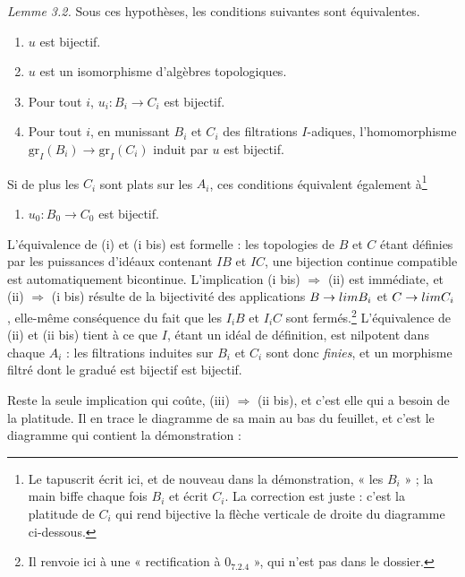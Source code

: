 \documentclass[11pt,a4paper]{article}
\begin{document}
\emph{Lemme 3.2.} Sous ces hypothèses, les conditions suivantes sont
équivalentes.

\begin{enumerate}
  \item[(i)] $u$ est bijectif.
  \item[(i bis)] $u$ est un isomorphisme d'algèbres topologiques.
  \item[(ii)] Pour tout $i$, $u_i : B_i \to C_i$ est bijectif.
  \item[(ii bis)] Pour tout $i$, en munissant $B_i$ et $C_i$ des filtrations
  $I$-adiques, l'homomorphisme $\mathrm{gr}_I(B_i) \to \mathrm{gr}_I(C_i)$
  induit par $u$ est bijectif.
\end{enumerate}

Si de plus les $C_i$ sont plats sur les $A_i$, ces conditions équivalent
également à\footnote{Le tapuscrit écrit ici, et de nouveau dans la
démonstration, « les $B_i$ » ; la main biffe chaque fois $B_i$ et écrit $C_i$.
La correction est juste : c'est la platitude de $C_i$ qui rend bijective la
flèche verticale de droite du diagramme ci-dessous.}

\begin{enumerate}
  \item[(iii)] $u_0 : B_0 \to C_0$ est bijectif.
\end{enumerate}

L'équivalence de (i) et (i bis) est formelle : les topologies de $B$ et $C$
étant définies par les puissances d'idéaux contenant $IB$ et $IC$, une
bijection continue compatible est automatiquement bicontinue. L'implication
(i bis) $\Rightarrow$ (ii) est immédiate, et (ii) $\Rightarrow$ (i bis) résulte
de la bijectivité des applications $B \to \varprojlim B_i$ et
$C \to \varprojlim C_i$, elle-même conséquence du fait que les $I_iB$ et $I_iC$
sont fermés.\footnote{Il renvoie ici à une « rectification à $0_{7.2.4}$ »,
qui n'est pas dans le dossier.} L'équivalence de (ii) et (ii bis) tient à ce
que $I$, étant un idéal de définition, est nilpotent dans chaque $A_i$ : les
filtrations induites sur $B_i$ et $C_i$ sont donc \emph{finies}, et un
morphisme filtré dont le gradué est bijectif est bijectif.

Reste la seule implication qui coûte, (iii) $\Rightarrow$ (ii bis), et c'est
elle qui a besoin de la platitude. Il en trace le diagramme de sa main au bas
du feuillet, et c'est le diagramme qui contient la démonstration :

\end{document}
